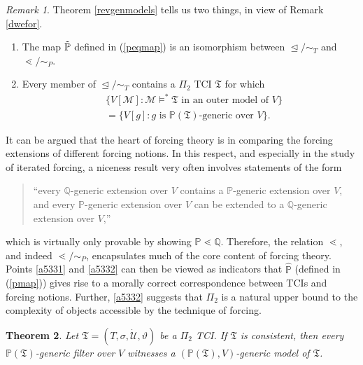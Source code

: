 \documentclass[12pt, twoside]{memoir}
\numberwithin{equation}{section}
\newtheorem{thm}{Theorem}[section]
\theoremstyle{definition}
\theoremstyle{remark}
\newtheorem{rem}[thm]{Remark}
\theoremstyle{definition}
\theoremstyle{definition}
\theoremstyle{definition}
\theoremstyle{remark}
\begin{document}
\begin{rem}\label{ramble1}
Theorem \ref{revgenmodels} tells us two things, in view of Remark \ref{dwefor}.
\begin{enumerate}[label=(\arabic*)]
    \item\label{a5331} The map $\Tilde{\mathbb{P}}$ defined in (\ref{peqmap}) is an isomorphism between $\trianglelefteq / \sim_T$ and $\lessdot / \sim_P$.
    \item\label{a5332} Every member of $\trianglelefteq / \sim_T$ contains a $\Pi_2$ TCI $\mathfrak{T}$ for which
    \begin{align*}
        & \{V[\mathcal{M}] : \mathcal{M} \models^* \mathfrak{T} \text{ in an outer model of } V\} \\
        & = \{V[g] : g \text{ is } \mathbb{P}(\mathfrak{T}) \text{-generic over } V\} \text{.}
    \end{align*}
\end{enumerate}
It can be argued that the heart of forcing theory is in comparing the forcing extensions of different forcing notions. In this respect, and especially in the study of iterated forcing, a niceness result very often involves statements of the form 
\begin{quote}
    ``every $\mathbb{Q}$-generic extension over $V$ contains a $\mathbb{P}$-generic extension over $V$, and every $\mathbb{P}$-generic extension over $V$ can be extended to a $\mathbb{Q}$-generic extension over $V$,''
\end{quote}
which is virtually only provable by showing $\mathbb{P} \lessdot \mathbb{Q}$. Therefore, the relation $\lessdot$, and indeed $\lessdot / \sim_P$, encapsulates much of the core content of forcing theory. Points \ref{a5331} and \ref{a5332} can then be viewed as indicators that $\hat{\mathbb{P}}$ (defined in (\ref{pmap})) gives rise to a morally correct correspondence between TCIs and forcing notions. Further, \ref{a5332} suggests that $\Pi_2$ is a natural upper bound to the complexity of objects accessible by the technique of forcing.
\end{rem}

\begin{thm}\label{genericmodels}
Let $\mathfrak{T} = (T, \sigma, \dot{\mathcal{U}}, \vartheta)$ be a $\Pi_2$ TCI. If $\mathfrak{T}$ is consistent, then every $\mathbb{P}(\mathfrak{T})$-generic filter over $V$ witnesses a $(\mathbb{P}(\mathfrak{T}), V)$-generic model of $\mathfrak{T}$.
\end{thm}
\end{document}

